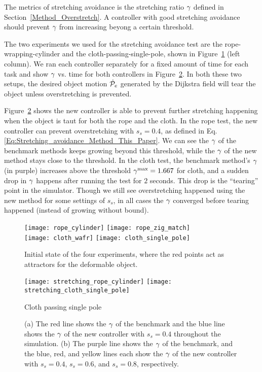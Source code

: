 The metrics of stretching avoidance is the stretching ratio $\gamma$ defined in Section~\ref{Method_Overstretch}. A controller with good stretching avoidance should prevent $\gamma$ from increasing beyong a certain threshold.

The two experiments we used for the stretching avoidance test are the rope-wrapping-cylinder and the cloth-passing-single-pole, shown in Figure~\ref{fig:experimental_setup_scene} (left column). We ran each controller separately for a fixed amount of time for each task and show $\gamma$ vs. time for both controllers in Figure~\ref{fig:experiment_stretching_factor}. In both these two setups, the desired object motion $\dot{\mathcal{P}}_e$ generated by the Dijkstra field will tear the object unless overstretching is prevented.%

Figure~\ref{fig:experiment_stretching_factor} shows the new controller is able to prevent further stretching happening when the object is taut for both the rope and the cloth. In the rope test, the new controller can prevent overstretching with $s_s = 0.4$, as defined in Eq.\ref{Eq:Stretching_avoidance_Method_This_Paper}. We can see the $\gamma$ of the benchmark methods keeps growing beyond this threshold, while the $\gamma$ of the new method stays close to the threshold. In the cloth test, the benchmark method's $\gamma$ (in purple) increases above the threshold $\gamma^{\textrm{max}} = 1.667$ for cloth, and a sudden drop in $\gamma$ happens after running the test for $2$ seconds. This drop is the ``tearing'' point in the simulator. Though we still see overstretching happened using the new method for some settings of $s_s$, in all cases the $\gamma$ converged before tearing happened (instead of growing without bound). 

\begin{figure}[t]
    \centering
    \texttt{[image: rope\_cylinder]}\hfill
    \texttt{[image: rope\_zig\_match]}\\
    \texttt{[image: cloth\_wafr]}\hfill
    \texttt{[image: cloth\_single\_pole]}%
    \caption{Initial state of the four experiments, where the red points act as attractors for the deformable object.}
    \label{fig:experimental_setup_scene}
\end{figure}


\begin{figure}[t]
    \centering
    \texttt{[image: stretching\_rope\_cylinder]} \hfill
    \texttt{[image: stretching\_cloth\_single\_pole]}%
    \caption{Cloth passing single pole}
    \label{Fig: stretching factor scene_cloth_single_pole}
    \caption{(a) The red line shows the $\gamma$ of the benchmark and the blue line shows the $\gamma$ of the new controller with $s_s = 0.4$ throughout the simulation. (b) The purple line shows the $\gamma$ of the benchmark, and the blue, red, and yellow lines each show the $\gamma$ of the new controller with $s_s = 0.4$, $s_s = 0.6$, and $s_s = 0.8$, respectively.}
    \label{fig:experiment_stretching_factor}
\end{figure}





